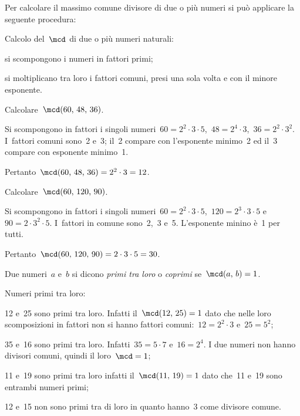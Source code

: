 Per calcolare il massimo comune divisore di due o più numeri si può applicare la seguente procedura:
\begin{procedura}
Calcolo del~$\mcd$ di due o più numeri naturali:
\begin{enumeratea}
 \item si scompongono i numeri in fattori primi;
 \item si moltiplicano tra loro i fattori comuni, presi una sola volta e con il minore esponente.
\end{enumeratea}
\end{procedura}

\begin{exrig}
 \begin{esempio}
 Calcolare~$\mcd(60\text{,~}48\text{,~}36)$.

Si scompongono in fattori i singoli numeri~$60=2^2\cdot 3\cdot 5$,~$48=2^4\cdot 3$,~$36 =2^2\cdot 3^2$.
I~fattori comuni sono~2 e~3; il~2 compare con l'esponente minimo~2 ed il~3 compare con esponente
minimo~1.

Pertanto~$\mcd(60\text{,~}48\text{,~}36)=2^2\cdot 3=12$.

 \end{esempio}

 \begin{esempio}
 Calcolare~$\mcd(60\text{,~}120\text{,~}90)$.

Si scompongono in fattori i singoli numeri~$60=2^2\cdot 3\cdot 5$,~$120=2^3\cdot 3\cdot 5$ e~$90=2\cdot 3^2\cdot 5$.
I~fattori in comune sono~2,~3 e~5. L'esponente minino è~1 per tutti.

Pertanto~$\mcd(60\text{,~}120\text{,~}90)=2\cdot 3\cdot 5=30$.
 \end{esempio}
\end{exrig}


\begin{definizione}
 Due numeri~$a$ e~$b$ si dicono \emph{primi tra loro} o \emph{coprimi} se~$\mcd(a\text{,~}b)=1$.
\end{definizione}

\begin{exrig}
 \begin{esempio}
 Numeri primi tra loro:
 \begin{itemize*}
 \item 12 e~25 sono primi tra loro. Infatti il~$\mcd(12\text{,~}25)=1$ dato che nelle loro scomposizioni in
fattori non si hanno fattori comuni:~$12=2^2\cdot 3$ e~$25=5^2$;
 \item 35 e~16 sono primi tra loro. Infatti~$35=5\cdot 7$ e~$16=2^4$. I due numeri non hanno
divisori comuni, quindi il loro~$\mcd=1$;
 \item 11 e~19 sono primi tra loro infatti il~$\mcd(11\text{,~}19)=1$ dato che~11 e~19 sono entrambi numeri primi;
 \item 12 e~15 non sono primi tra di loro in quanto hanno~3 come divisore comune.
 \end{itemize*}
 \end{esempio}
\end{exrig}


